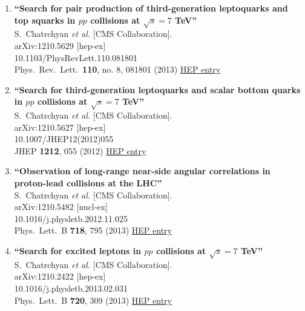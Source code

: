 \documentclass{article}
\begin{document}
\begin{enumerate}
\item%
{\bf ``Search for pair production of third-generation leptoquarks and top squarks in $pp$ collisions at $\sqrt{s}=7$ TeV''}
  \\{}S.~Chatrchyan {\it et al.} [CMS Collaboration].
  \\{}arXiv:1210.5629 [hep-ex]
    \\{}10.1103/PhysRevLett.110.081801
\\{}Phys.\ Rev.\ Lett.\  {\bf 110}, no. 8, 081801 (2013) %
\href{http://inspirehep.net/record/1192034}{HEP entry}


\item%
{\bf ``Search for third-generation leptoquarks and scalar bottom quarks in $pp$ collisions at $\sqrt{s}=7$ TeV''}
  \\{}S.~Chatrchyan {\it et al.} [CMS Collaboration].
  \\{}arXiv:1210.5627 [hep-ex]
    \\{}10.1007/JHEP12(2012)055
\\{}JHEP {\bf 1212}, 055 (2012) %
\href{http://inspirehep.net/record/1192033}{HEP entry}


\item%
{\bf ``Observation of long-range near-side angular correlations in proton-lead collisions at the LHC''}
  \\{}S.~Chatrchyan {\it et al.} [CMS Collaboration].
  \\{}arXiv:1210.5482 [nucl-ex]
    \\{}10.1016/j.physletb.2012.11.025
\\{}Phys.\ Lett.\ B {\bf 718}, 795 (2013) %
\href{http://inspirehep.net/record/1191899}{HEP entry}


\item%
{\bf ``Search for excited leptons in $pp$ collisions at $\sqrt{s}=7$ TeV''}
  \\{}S.~Chatrchyan {\it et al.} [CMS Collaboration].
  \\{}arXiv:1210.2422 [hep-ex]
    \\{}10.1016/j.physletb.2013.02.031
\\{}Phys.\ Lett.\ B {\bf 720}, 309 (2013) %
\href{http://inspirehep.net/record/1189987}{HEP entry}



\end{enumerate}
\end{document}

